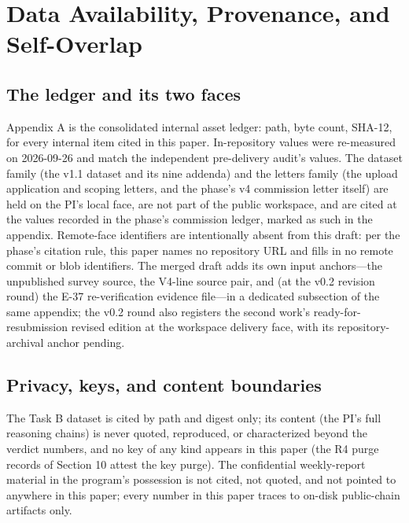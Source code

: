 \documentclass[11pt]{article}
\begin{document}
\section{Data Availability, Provenance, and Self-Overlap}
\label{sec:22}
\subsection{The ledger and its two faces}
\noindent Appendix A is the consolidated internal asset ledger: path, byte count, SHA-12, for every internal item cited in this paper. In-repository values were re-measured on 2026-09-26 and match the independent pre-delivery audit's values. The dataset family (the v1.1 dataset and its nine addenda) and the letters family (the upload application and scoping letters, and the phase's v4 commission letter itself) are held on the PI's local face, are not part of the public workspace, and are cited at the values recorded in the phase's commission ledger, marked as such in the appendix. Remote-face identifiers are intentionally absent from this draft: per the phase's citation rule, this paper names no repository URL and fills in no remote commit or blob identifiers. The merged draft adds its own input anchors—the unpublished survey source, the V4-line source pair, and (at the v0.2 revision round) the E-37 re-verification evidence file—in a dedicated subsection of the same appendix; the v0.2 round also registers the second work's ready-for-resubmission revised edition at the workspace delivery face, with its repository-archival anchor pending.\par
\subsection{Privacy, keys, and content boundaries}
\noindent The Task B dataset is cited by path and digest only; its content (the PI's full reasoning chains) is never quoted, reproduced, or characterized beyond the verdict numbers, and no key of any kind appears in this paper (the R4 purge records of Section 10 attest the key purge). The confidential weekly-report material in the program's possession is not cited, not quoted, and not pointed to anywhere in this paper; every number in this paper traces to on-disk public-chain artifacts only.\par
\end{document}
